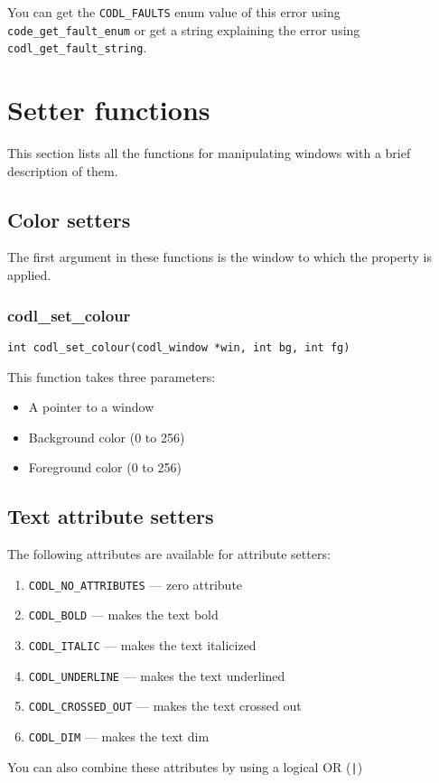 \documentclass{article}
\newcommand{\fstep}{\vspace{3mm}\noindent}
\begin{document}
You can get the {\tt CODL\_FAULTS} enum value of this error using
{\tt code\_get\_fault\_enum} or get a string explaining the error using
{\tt codl\_get\_fault\_string}.

\section{Setter functions}
This section lists all the functions for manipulating windows with a brief
description of them.

\subsection{Color setters}

The first argument in these functions is the window to which the property is applied.

\subsubsection{codl\_set\_colour}
{\tt int codl\_set\_colour(codl\_window *win, int bg, int fg)}

\fstep{} This function takes three parameters:
\begin{itemize}
\item{A pointer to a window}
\item{Background color (0 to 256)}
\item{Foreground color (0 to 256)}
\end{itemize}

\subsection{Text attribute setters}
The following attributes are available for attribute setters:
\begin{enumerate}
\item{{\tt CODL\_NO\_ATTRIBUTES} --- zero attribute}
\item{{\tt CODL\_BOLD} --- makes the text bold}
\item{{\tt CODL\_ITALIC} --- makes the text italicized}
\item{{\tt CODL\_UNDERLINE} --- makes the text underlined}
\item{{\tt CODL\_CROSSED\_OUT} --- makes the text crossed out}
\item{{\tt CODL\_DIM} --- makes the text dim}  
\end{enumerate}

\noindent\vspace{3mm} You can also combine these attributes by using a logical OR ({\tt |})
\end{document}
